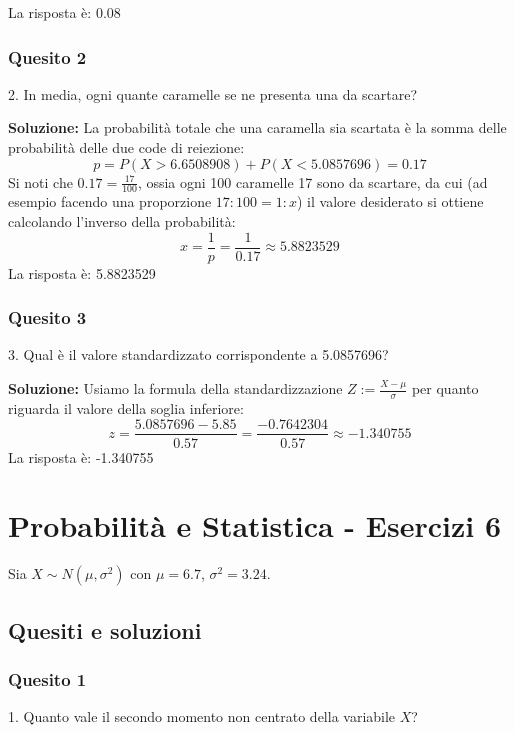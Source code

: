 \documentclass[12pt, a4paper]{article}
\begin{document}
La risposta è: 0.08

\subsubsection*{Quesito 2}
2. In media, ogni quante caramelle se ne presenta una da scartare?

\textbf{Soluzione:}
La probabilità totale che una caramella sia scartata è la somma delle probabilità delle due code di reiezione: 
$$ p = P(X > 6.6508908) + P(X < 5.0857696) = 0.17 $$
Si noti che $0.17 = \frac{17}{100}$, ossia ogni 100 caramelle 17 sono da scartare, da cui (ad esempio facendo una proporzione $17:100 = 1:x$) il valore desiderato si ottiene calcolando l'inverso della probabilità:
$$ x = \frac{1}{p} = \frac{1}{0.17} \approx 5.8823529 $$
La risposta è: 5.8823529

\subsubsection*{Quesito 3}
3. Qual è il valore standardizzato corrispondente a 5.0857696?

\textbf{Soluzione:}
Usiamo la formula della standardizzazione $Z := \frac{X-\mu}{\sigma}$ per quanto riguarda il valore della soglia inferiore:
$$ z = \frac{5.0857696 - 5.85}{0.57} = \frac{-0.7642304}{0.57} \approx -1.340755 $$
La risposta è: -1.340755

\section*{Probabilità e Statistica - Esercizi 6}

\begin{tcolorbox}[colback=lightergray!10, colframe=tocsec, title=\textbf{Esercizio 1}]
Sia $X \sim N(\mu,\sigma^2)$ con $\mu=6.7$, $\sigma^2=3.24$.
\end{tcolorbox}

\subsection*{Quesiti e soluzioni}

\subsubsection*{Quesito 1}
1. Quanto vale il secondo momento non centrato della variabile $X$?
\end{document}
